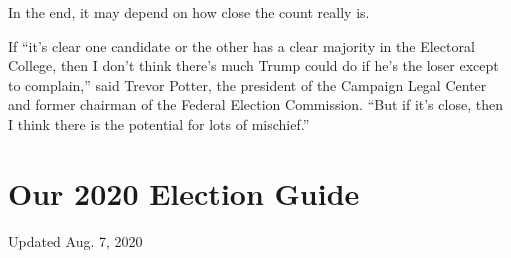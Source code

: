 In the end, it may depend on how close the count really is.

If ``it's clear one candidate or the other has a clear majority in the
Electoral College, then I don't think there's much Trump could do if
he's the loser except to complain,'' said Trevor Potter, the president
of the Campaign Legal Center and former chairman of the Federal Election
Commission. ``But if it's close, then I think there is the potential for
lots of mischief.''

\hypertarget{our-2020-election-guide}{%
\section{Our 2020 Election Guide}\label{our-2020-election-guide}}

Updated Aug. 7, 2020


